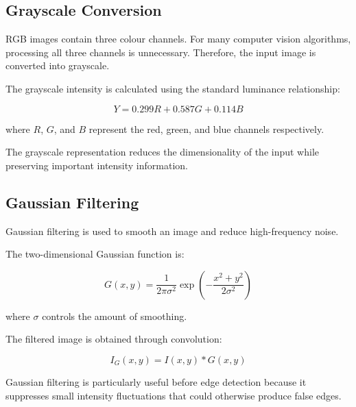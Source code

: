 \documentclass[11pt,a4paper]{article}
\begin{document}
\subsection{Grayscale Conversion}

RGB images contain three colour channels. For many computer vision algorithms, processing all three channels is unnecessary. Therefore, the input image is converted into grayscale.

The grayscale intensity is calculated using the standard luminance relationship:

\begin{equation}
Y = 0.299R + 0.587G + 0.114B
\end{equation}

where $R$, $G$, and $B$ represent the red, green, and blue channels respectively.

The grayscale representation reduces the dimensionality of the input while preserving important intensity information.


\subsection{Gaussian Filtering}

Gaussian filtering is used to smooth an image and reduce high-frequency noise.

The two-dimensional Gaussian function is:

\begin{equation}
G(x,y)=
\frac{1}{2\pi\sigma^2}
\exp
\left(
-\frac{x^2+y^2}{2\sigma^2}
\right)
\end{equation}

where $\sigma$ controls the amount of smoothing.

The filtered image is obtained through convolution:

\begin{equation}
I_{G}(x,y)=I(x,y)*G(x,y)
\end{equation}

Gaussian filtering is particularly useful before edge detection because it suppresses small intensity fluctuations that could otherwise produce false edges.

\end{document}
